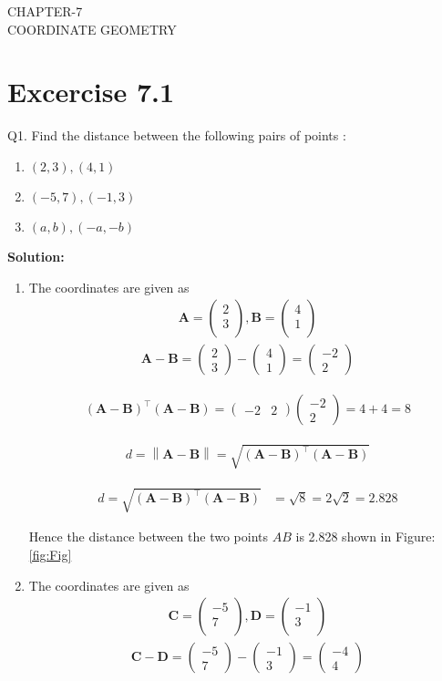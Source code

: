 \documentclass[12pt]{article}
\providecommand{\brak}[1]{\ensuremath{\left(#1\right)}}
\providecommand{\norm}[1]{\left\lVert#1\right\rVert}
\newcommand{\solution}{\noindent \textbf{Solution: }}
\newcommand{\myvec}[1]{\ensuremath{\begin{pmatrix}#1\end{pmatrix}}}
\let\vec\mathbf
\begin{document}
\begin{center}
\textbf\large{CHAPTER-7 \\ COORDINATE GEOMETRY}
\end{center}
\section*{Excercise 7.1}

Q1. Find the distance between the following pairs of points :
\begin{enumerate}
	\item $\brak{2,3}, \brak{4,1}$ 
	\item $\brak{-5,7}, \brak{-1,3}$
	\item $\brak{a,b}, \brak{-a,-b}$
\end{enumerate}
\solution
\begin{enumerate}
\item The coordinates are given as
	\begin{align}
	\vec{A} = \myvec{
		2\\
		3\\
		},
	\vec{B} = \myvec{
		4\\
		1\\
		}
	\end{align}
	\begin{align}
		\vec{A} - \vec{B} = \myvec{2\\3} - \myvec{4\\1} = \myvec{-2\\2}		
	\end{align}
	
	
	
	\begin{align}
		(\vec{A}-\vec{B})^\top (\vec{A}-\vec{B}) = \myvec{-2&2} \myvec{-2\\2} = 4+4 = 8
	\end{align}
	
	\begin{align}
	d={\norm{\vec{A}-\vec{B}}}=\sqrt{\brak{\vec{A} -\vec{B}}^{\top}\brak{\vec{A} -\vec{B}}}
	\end{align}

\begin{align}
d=\sqrt{\brak{\vec{A} -\vec{B}}^{\top}\brak{\vec{A} -\vec{B}}}
 &=\sqrt{8}=2\sqrt{2}=2.828
\end{align}	
	
	Hence the distance between the two points $AB$ is 2.828  shown in Figure:\ref{fig:Fig}


\item The coordinates are given as
	\begin{align}
	\vec{C} = \myvec{
		-5\\
		7\\
		},
	\vec{D} = \myvec{
		-1\\
		3\\
		}
	\end{align}
	\begin{align}
		\vec{C} - \vec{D} = \myvec{-5\\7} - \myvec{-1\\3} = \myvec{-4\\4}		
	\end{align}
	

\end{enumerate}
\end{document}
